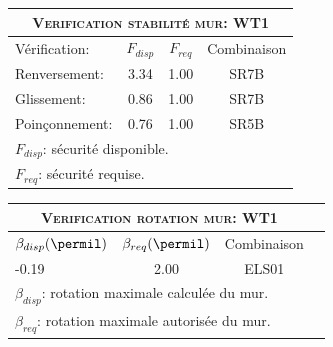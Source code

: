 \begin{center}
\begin{tabular}[H]{|l|c|c|c|}
\hline
\multicolumn{4}{|c|}{\textsc{Verification stabilité mur: WT1}}\\
\hline
Vérification:  & $F_{disp}$ & $F_{req}$ & Combinaison\\
\hline
Renversement:  & 3.34 & 1.00 & SR7B\\
Glissement:  & 0.86 & 1.00 & SR7B\\
Poinçonnement:  & 0.76 & 1.00 & SR5B\\
\hline
\multicolumn{4}{|l|}{$F_{disp}$: sécurité disponible.}\\
\multicolumn{4}{|l|}{$F_{req}$: sécurité requise.}\\
\hline
\end{tabular}
\end{center}
\begin{center}
\begin{tabular}[H]{|l|c|c|c|}
\hline
\multicolumn{3}{|c|}{\textsc{Verification rotation mur: WT1}}\\
\hline
$\beta_{disp} (\permil)$ & $\beta_{req}(\permil)$ & Combinaison\\
\hline
-0.19 & 2.00 & ELS01\\
\hline
\multicolumn{3}{|l|}{$\beta_{disp}$: rotation maximale calculée du mur.}\\
\multicolumn{3}{|l|}{$\beta_{req}$: rotation maximale autorisée du mur.}\\
\hline
\end{tabular}
\end{center}
 \label{tb_WT1}
\tablelasttail{\hline}
